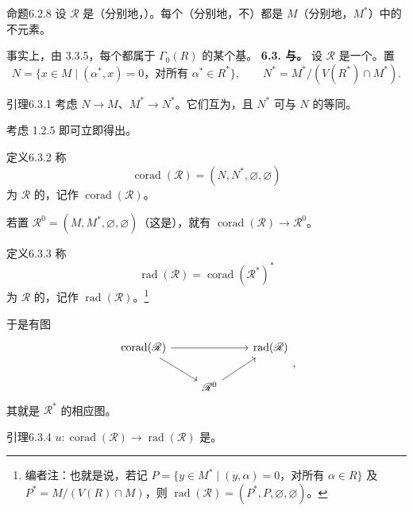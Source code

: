 \begin{SGAresult}{命题}{6.2.8}
设 $\mathscr R$ 是（分别地，）。每个（分别地，不）都是 $M$（分别地，$M^*$）中的不元素。
\end{SGAresult}
事实上，由 3.3.5，每个都属于 $\Gamma_0(R)$ 的某个基。
\textbf{6.3. 与。}
设 $\mathscr R$ 是一个。置
\[N=\{x\in M\mid(\alpha^*,x)=0\text{，对所有 }\alpha^*\in R^*\},\qquad
N^*=M^*/(V(R^*)\cap M^*).\]
\begin{SGAresult}{引理}{6.3.1}
考虑 $N\to M$、$M^*\to N^*$。它们互为，且 $N^*$ 可与 $N$ 的等同。
\end{SGAresult}
考虑 1.2.5 即可立即得出。
\begin{SGAresult}{定义}{6.3.2}
称
\[\operatorname{corad}(\mathscr R)=(N,N^*,\varnothing,\varnothing)\]
为 $\mathscr R$ 的，记作 $\operatorname{corad}(\mathscr R)$。
\end{SGAresult}
若置 $\mathscr R^0=(M,M^*,\varnothing,\varnothing)$（这是），就有 $\operatorname{corad}(\mathscr R)\to\mathscr R^0$。
\begin{SGAresult}{定义}{6.3.3}
称
\[\operatorname{rad}(\mathscr R)=\operatorname{corad}(\mathscr R^*)^*\]
为 $\mathscr R$ 的，记作 $\operatorname{rad}(\mathscr R)$。\footnote{编者注：也就是说，若记 $P=\{y\in M^*\mid(y,\alpha)=0\text{，对所有 }\alpha\in R\}$ 及 $P^*=M/(V(R)\cap M)$，则 $\operatorname{rad}(\mathscr R)=(P^*,P,\varnothing,\varnothing)$。}
\end{SGAresult}
于是有图
\[\begin{tikzcd}
\operatorname{corad}(\mathscr R)\arrow[rr]\arrow[dr]&&\operatorname{rad}(\mathscr R)\\
&\mathscr R^0\arrow[ur]&
\end{tikzcd},\]
其就是 $\mathscr R^*$ 的相应图。
\begin{SGAresult}{引理}{6.3.4}
 $u:\operatorname{corad}(\mathscr R)\to\operatorname{rad}(\mathscr R)$ 是。
\end{SGAresult}
